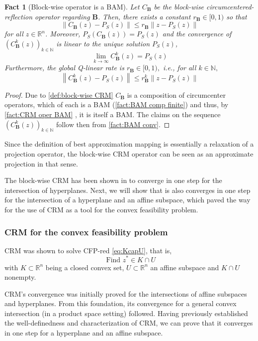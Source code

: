 \documentclass[smallextended,numbook,nospthms]{svjour3}
\theoremstyle{plain}
\newtheorem{fact}[theorem]{Fact}
\theoremstyle{definition}
\def\RR{\mathds R}
\def\NN{\mathds N}
\begin{document}
\begin{fact}[Block-wise operator is a BAM]\label{fact: block-wise CRM oper BAM}
	Let $C_{\mathbf{B}}$ be the block-wise circumcentered-reflection operator regarding
	$\mathbf{B}$. Then, there exists a constant $r_{\mathbf{B}} \in[0,1)$ so that
	$$
	\left\|C_{\mathbf{B}}(z)-P_{S}(z)\right\| \leq r_{\mathbf{B}}\left\|z-P_{S}(z)\right\|
	$$
	for all $z \in \RR^{n}$. Moreover, $P_{S}\left(C_{\mathbf{B}}(z)\right)=P_{S}(z)$ and the convergence of $\left(C_{\mathbf{B}}^{k}(z)\right)_{k \in \NN}$ is linear to the unique solution $P_{S}(z)$,
	$$
	\lim _{k \rightarrow \infty} C_{\mathbf{B}}^{k}(z)=P_{S}(z)
	$$
	Furthermore, the global Q-linear rate is $r_{\mathbf{B}} \in[0,1),$ i.e., for all $k \in \NN,$
	$$
	\left\|C_{\mathbf{B}}^{k}(z)-P_{S}(z)\right\| \leq r_{\mathbf{B}}^{k}\left\|z-P_{S}(z)\right\|
	$$
\end{fact}
\begin{proof}
	Due to \cref{def:block-wise CRM} $C_{\mathbf{B}}$ is a composition of circumcenter operators, which of each is a BAM (\cref{fact:BAM comp finite}) and thus, by \cref{fact:CRM oper BAM} , it is itself a BAM. The claims on the sequence $\left(C_{\mathbf{B}}^{k}(z)\right)_{k \in \NN}$ follow then from \cref{fact:BAM conv}.
\end{proof}

Since the definition of best approximation mapping is essentially a relaxation of a projection operator, the block-wise CRM operator can be seen as an approximate projection in that sense.

The block-wise CRM has been shown in \cite[Lemma 3, Lemma 4, Theorem 4]{Behling:2019dj} to converge in one step for the intersection of hyperplanes. Next, we will show that is also converges in one step for the intersection of a hyperplane and an affine subspace, which paved the way for the use of CRM as a tool for the convex feasibility problem.

\subsubsection{CRM for the convex feasibility problem}\label{subsubsec:CRM for CFP}
CRM was shown to solve CFP-red \cref{eq:KcapU}, that is, 
\[
\text { Find } z^{*} \in K \cap U
\]
with $K \subset \RR^{n}$ being a closed convex set, $U \subset \RR^{n}$ an affine subspace and $K \cap U$ nonempty.

CRM's convergence was initially proved for the intersections of affine subspaces and hyperplanes. From this foundation, its convergence for a general convex intersection (in a product space setting) followed. Having previously established the well-definedness and characterization of CRM, we can prove that it converges in one step for a hyperplane and an affine subspace.
\end{document}
